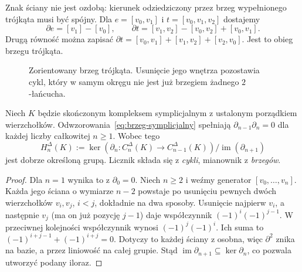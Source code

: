 Znak ściany nie jest ozdobą: kierunek odziedziczony
przez brzeg wypełnionego trójkąta musi być spójny.
Dla $e=[v_0,v_1]$ i $t=[v_0,v_1,v_2]$ dostajemy
\[
 \partial e=[v_1]-[v_0],\qquad
 \partial t=[v_1,v_2]-[v_0,v_2]+[v_0,v_1].
\]
Drugą równość można zapisać
$\partial t=[v_0,v_1]+[v_1,v_2]+[v_2,v_0]$.
Jest to obieg brzegu trójkąta.

\begin{figure}[!htbp]
\centering
{}
\caption{Zorientowany brzeg trójkąta. Usunięcie jego
wnętrza pozostawia cykl, który w samym okręgu
nie jest już brzegiem żadnego $2$-łańcucha.}
\label{fig:homologia-trojkat}
\end{figure}

\begin{twierdzenie}
\label{thm:brzeg-brzegu}
Niech $K$ będzie skończonym kompleksem symplicjalnym
z ustalonym porządkiem wierzchołków.
Odwzorowania~\eqref{eq:brzeg-symplicjalny}
spełniają $\partial_{n-1}\partial_n=0$
dla każdej liczby całkowitej $n\geq1$.
Wobec tego
\[
 H_n^\Delta(K):=
 \ker(\partial_n:C_n^\Delta(K)\to C_{n-1}^\Delta(K))
 \big/
 \operatorname{im}(\partial_{n+1})
\]
jest dobrze określoną grupą. Licznik składa
się z \emph{cykli}, mianownik z \emph{brzegów}.
\end{twierdzenie}
\begin{proof}
Dla $n=1$ wynika to z $\partial_0=0$.
Niech $n\geq2$ i weźmy generator
$[v_0,\ldots,v_n]$. Każda jego ściana
o wymiarze $n-2$ powstaje po usunięciu
pewnych dwóch wierzchołków $v_i,v_j$,
$i<j$, dokładnie na dwa sposoby.
Usunięcie najpierw $v_i$, a następnie
$v_j$ (ma on już pozycję $j-1$) daje
współczynnik $(-1)^i(-1)^{j-1}$.
W przeciwnej kolejności współczynnik
wynosi $(-1)^j(-1)^i$.
Ich suma to
$(-1)^{i+j-1}+(-1)^{i+j}=0$.
Dotyczy to każdej ściany z osobna,
więc $\partial^2$ znika na bazie,
a przez liniowość na całej grupie.
Stąd $\operatorname{im}\partial_{n+1}
\subseteq\ker\partial_n$, co pozwala
utworzyć podany iloraz.
\end{proof}

